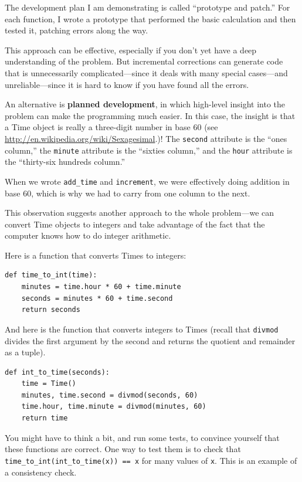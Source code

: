 \documentclass[10pt]{book}
\begin{document}
\begin{CJK}{UTF8}{gbsn}
The development plan I am demonstrating is called ``prototype and
patch.''  For each function, I wrote a prototype that performed the
basic calculation and then tested it, patching errors along the
way.

This approach can be effective, especially if you don't yet have a
deep understanding of the problem.  But incremental corrections can
generate code that is unnecessarily complicated---since it deals with
many special cases---and unreliable---since it is hard to know if you
have found all the errors.

An alternative is {\bf planned development}, in which high-level
insight into the problem can make the programming much easier.  In
this case, the insight is that a Time object is really a three-digit
number in base 60 (see \url{http://en.wikipedia.org/wiki/Sexagesimal}.)!  The
{\tt second} attribute is the ``ones column,'' the {\tt minute}
attribute is the ``sixties column,'' and the {\tt hour} attribute is
the ``thirty-six hundreds column.''

When we wrote \verb"add_time" and {\tt increment}, we were effectively
doing addition in base 60, which is why we had to carry from one
column to the next.

This observation suggests another approach to the whole problem---we
can convert Time objects to integers and take advantage of the fact
that the computer knows how to do integer arithmetic.  

Here is a function that converts Times to integers:

\begin{verbatim}
def time_to_int(time):
    minutes = time.hour * 60 + time.minute
    seconds = minutes * 60 + time.second
    return seconds
\end{verbatim}
%
And here is the function that converts integers to Times
(recall that {\tt divmod} divides the first argument by the second
and returns the quotient and remainder as a tuple).

\begin{verbatim}
def int_to_time(seconds):
    time = Time()
    minutes, time.second = divmod(seconds, 60)
    time.hour, time.minute = divmod(minutes, 60)
    return time
\end{verbatim}
%
You might have to think a bit, and run some tests, to convince
yourself that these functions are correct.  One way to test them is to
check that \verb"time_to_int(int_to_time(x)) == x" for many values of
{\tt x}.  This is an example of a consistency check.


\end{CJK}
\end{document}
